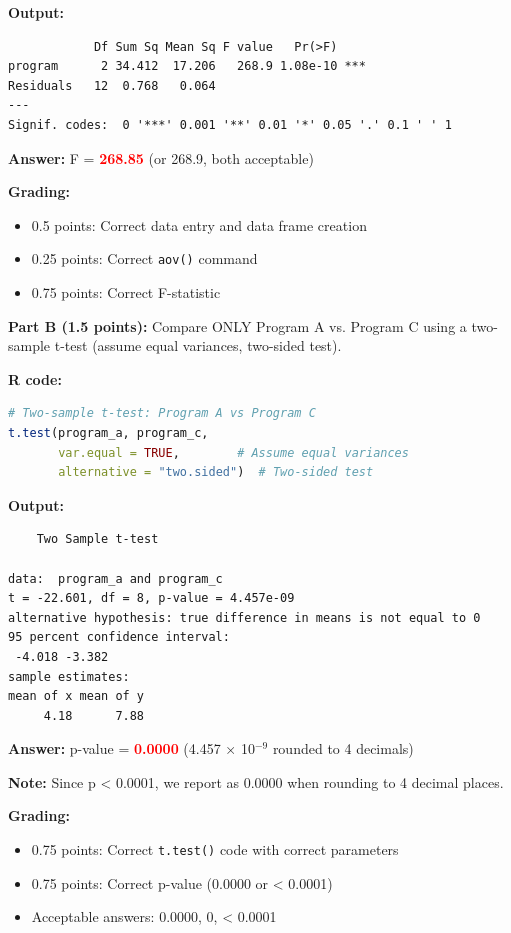 \documentclass[11pt]{article}
\begin{document}
\textbf{Output:}
\begin{verbatim}
            Df Sum Sq Mean Sq F value   Pr(>F)
program      2 34.412  17.206   268.9 1.08e-10 ***
Residuals   12  0.768   0.064
---
Signif. codes:  0 '***' 0.001 '**' 0.01 '*' 0.05 '.' 0.1 ' ' 1
\end{verbatim}

\textbf{Answer:} F = \textcolor{red}{\textbf{268.85}} (or 268.9, both acceptable)

\textbf{Grading:}
\begin{itemize}
\item 0.5 points: Correct data entry and data frame creation
\item 0.25 points: Correct \texttt{aov()} command
\item 0.75 points: Correct F-statistic
\end{itemize}

\vspace{0.5cm}

\textbf{Part B (1.5 points):} Compare ONLY Program A vs. Program C using a two-sample t-test (assume equal variances, two-sided test).

\vspace{0.3cm}

\textbf{R code:}

\begin{lstlisting}[language=R,basicstyle=\small\ttfamily,frame=single]
# Two-sample t-test: Program A vs Program C
t.test(program_a, program_c,
       var.equal = TRUE,        # Assume equal variances
       alternative = "two.sided")  # Two-sided test
\end{lstlisting}

\textbf{Output:}
\begin{verbatim}
	Two Sample t-test

data:  program_a and program_c
t = -22.601, df = 8, p-value = 4.457e-09
alternative hypothesis: true difference in means is not equal to 0
95 percent confidence interval:
 -4.018 -3.382
sample estimates:
mean of x mean of y
     4.18      7.88
\end{verbatim}

\textbf{Answer:} p-value = \textcolor{red}{\textbf{0.0000}} (4.457 × 10$^{-9}$ rounded to 4 decimals)

\textbf{Note:} Since p < 0.0001, we report as 0.0000 when rounding to 4 decimal places.

\textbf{Grading:}
\begin{itemize}
\item 0.75 points: Correct \texttt{t.test()} code with correct parameters
\item 0.75 points: Correct p-value (0.0000 or < 0.0001)
\item Acceptable answers: 0.0000, 0, < 0.0001
\end{itemize}
\end{document}
